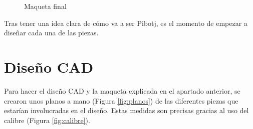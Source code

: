 \begin{figure}[ht!]
\begin{minipage}{0.4\linewidth}
		\caption*{\centering}
	\end{minipage}
	\caption{Maqueta final}
	\label{fig:maqueta2}
\end{figure}

Tras tener una idea clara de cómo va a ser Pibotj, es el momento de empezar a diseñar cada una de las piezas. 

\section{Diseño CAD}

Para hacer el diseño \acs{CAD} y la maqueta explicada en el apartado anterior, se crearon unos planos a mano (Figura \ref{fig:planos}) de las diferentes piezas que estarían involucradas en el diseño. Estas medidas son precisas gracias al uso del calibre (Figura \ref{fig:calibre}).


